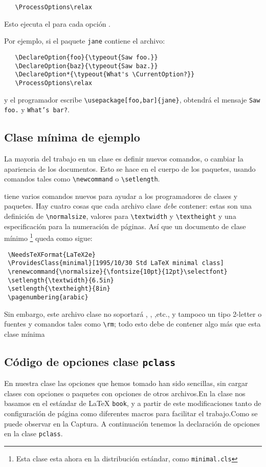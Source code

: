 \begin{verbatim}
   \ProcessOptions\relax
\end{verbatim}
Esto ejecuta el  para cada opción .
 
Por ejemplo, si el paquete \verb|jane| contiene el archivo:
\begin{verbatim}
   \DeclareOption{foo}{\typeout{Saw foo.}}
   \DeclareOption{baz}{\typeout{Saw baz.}}
   \DeclareOption*{\typeout{What's \CurrentOption?}}
   \ProcessOptions\relax
\end{verbatim}
y el programador escribe \verb|\usepackage[foo,bar]{jane}|, obtendrá el mensaje \texttt{Saw foo.} y \texttt{What's bar?}.


\subsection{Clase mínima de ejemplo}
\label{sec:claseminima}
La mayoria del trabajo en un clase es definir nuevos comandos, o cambiar la apariencia de los documentos. Esto se hace en el cuerpo de los paquetes, usando comandos tales como \verb|\newcommand| o \verb|\setlength|.

\LaTeXe{} tiene varios comandos nuevos para ayudar a los programadores de clases y paquetes.
Hay cuatro cosas que cada archivo clase \emph{debe} contener: estas son una definición de \verb|\normalsize|, valores para \verb|\textwidth| y \verb|\textheight| y una especificación para la numeración de páginas. Así que un documento de clase mínimo \footnote{Esta clase esta ahora en la distribución estándar, como \texttt{minimal.cls}} queda como sigue:

\begin{verbatim}
 \NeedsTeXFormat{LaTeX2e}
 \ProvidesClass{minimal}[1995/10/30 Std LaTeX minimal class]
 \renewcommand{\normalsize}{\fontsize{10pt}{12pt}\selectfont}
 \setlength{\textwidth}{6.5in}
 \setlength{\textheight}{8in}
 \pagenumbering{arabic}       
\end{verbatim}
Sin embargo, este archivo clase no soportará , , ,etc., y tampoco un tipo 2-letter o fuentes y comandos tales como \verb|\rm|; todo esto debe de contener algo más que esta clase mínima


\subsection{Código de opciones clase \texttt{pclass}}
En nuestra clase las opciones que hemos tomado han sido sencillas, sin cargar clases con opciones o paquetes con opciones de otros archivos.En la clase nos basamos en el estándar de \LaTeX{} \verb|book|, y a partir de este modificaciones tanto de  configuración de página como diferentes macros para facilitar el trabajo.Como se puede observar en la Captura.  A continuación tenemos la declaración de opciones en la clase \texttt{pclass}.

